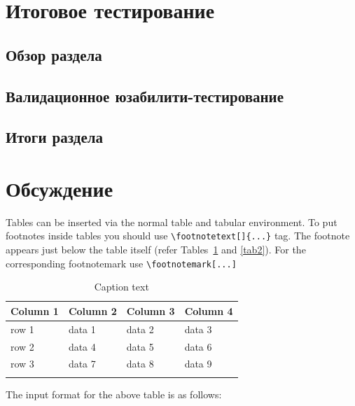 \documentclass[pdflatex,sn-mathphys-num]{sn-jnl}%
\theoremstyle{thmstyleone}%
\theoremstyle{thmstyletwo}%
\theoremstyle{thmstylethree}%
\begin{document}
\section{Итоговое тестирование}

\subsection{Обзор раздела}

\subsection{Валидационное юзабилити-тестирование}

\subsection{Итоги раздела}

\section{Обсуждение}\label{Discussion}

Tables can be inserted via the normal table and tabular environment. To put
footnotes inside tables you should use \verb+\footnotetext[]{...}+ tag.
The footnote appears just below the table itself (refer Tables~\ref{tab1} and \ref{tab2}). 
For the corresponding footnotemark use \verb+\footnotemark[...]+

\begin{table}[h]
\caption{Caption text}\label{tab1}%
\begin{tabular}{@{}llll@{}}
\toprule
Column 1 & Column 2  & Column 3 & Column 4\\
\midrule
row 1    & data 1   & data 2  & data 3  \\
row 2    & data 4   & data 5\footnotemark[1]  & data 6  \\
row 3    & data 7   & data 8  & data 9\footnotemark[2]  \\
\botrule
\end{tabular}
\end{table}

\noindent
The input format for the above table is as follows:
\end{document}
